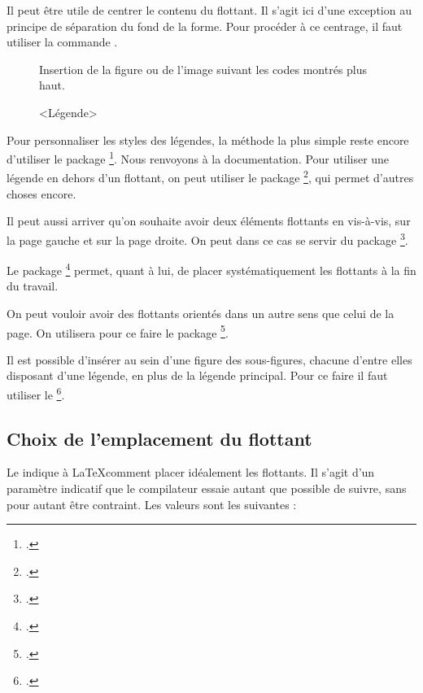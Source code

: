 \begin{plusloins}

Il peut être utile de centrer le contenu du flottant. Il s'agit ici d'une exception au principe de séparation du fond de la forme. Pour procéder à ce centrage, il faut utiliser la commande .

\begin{latexcode}
\begin{figure}[<paramètre de placement>]
	\centering
	Insertion de la figure ou de l'image suivant les codes montrés plus haut.
	\caption{<Légende>}
\end{figure} 
\end{latexcode}


Pour personnaliser les styles des légendes, la méthode la plus simple reste encore d'utiliser le package \footcite{caption}. Nous renvoyons à la documentation.
Pour utiliser une légende en dehors d'un flottant, on peut utiliser le package \footcite{ccaption}, qui permet d'autres choses encore.

Il peut aussi arriver qu'on souhaite avoir deux éléments flottants en vis-à-vis, sur la page gauche et sur la page droite. On peut dans ce cas se servir du package \footcite{dpfloat}.

Le package \footcite{endfloat} permet, quant à lui, de placer systématiquement les flottants à la fin du travail.

On peut vouloir avoir des flottants orientés dans un autre sens que celui de la page. On utilisera pour ce faire le package \footcite{rotfloat}.

Il est possible d'insérer au sein d'une figure des sous-figures, chacune d'entre elles disposant d'une légende, en plus de la légende principal.
Pour ce faire il faut utiliser le  \footcite{subcaption}.
\end{plusloins}



\subsection{Choix de l'emplacement du flottant}

Le  indique à \LaTeX comment placer idéalement les flottants. Il s'agit d'un paramètre indicatif que le compilateur essaie autant que possible de suivre, sans pour autant être contraint. Les valeurs sont les suivantes :

